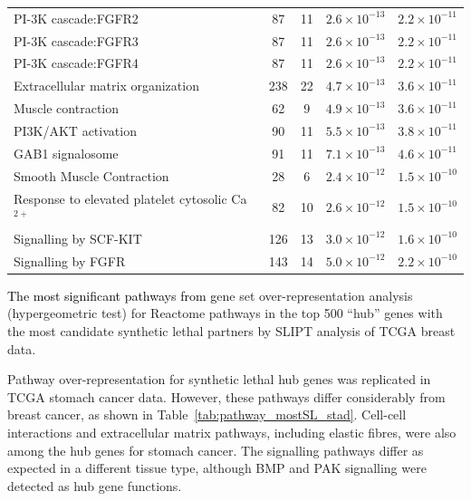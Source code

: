 \begin{table}[!ht]
{\begin{threeparttable}
\begin{tabular}{lcccc}
  \rowcolor{black!5}
  PI-3K cascade:FGFR2 &  87 &  11 & $2.6 \times 10^{-13}$ & $2.2 \times 10^{-11}$ \\ 
  \rowcolor{black!10}
  PI-3K cascade:FGFR3 &  87 &  11 & $2.6 \times 10^{-13}$ & $2.2 \times 10^{-11}$ \\ 
  \rowcolor{black!5}
  PI-3K cascade:FGFR4 &  87 &  11 & $2.6 \times 10^{-13}$ & $2.2 \times 10^{-11}$ \\ 
  \rowcolor{black!10}
  Extracellular matrix organization & 238 &  22 & $4.7 \times 10^{-13}$ & $3.6 \times 10^{-11}$ \\ 
  \rowcolor{black!5}
  Muscle contraction &  62 &   9 & $4.9 \times 10^{-13}$ & $3.6 \times 10^{-11}$ \\ 
  \rowcolor{black!10}
  PI3K/AKT activation &  90 &  11 & $5.5 \times 10^{-13}$ & $3.8 \times 10^{-11}$ \\ 
  \rowcolor{black!5}
  GAB1 signalosome &  91 &  11 & $7.1 \times 10^{-13}$ & $4.6 \times 10^{-11}$ \\ 
  \rowcolor{black!10}
  Smooth Muscle Contraction &  28 &   6 & $2.4 \times 10^{-12}$ & $1.5 \times 10^{-10}$ \\ 
  \rowcolor{black!5}
  Response to elevated platelet cytosolic Ca$^{2+}$ &  82 &  10 & $2.6 \times 10^{-12}$ & $1.5 \times 10^{-10}$ \\ 
  \rowcolor{black!10}
  Signalling by SCF-KIT & 126 &  13 & $3.0 \times 10^{-12}$ & $1.6 \times 10^{-10}$ \\ 
  \rowcolor{black!5}
  Signalling by FGFR & 143 &  14 & $5.0 \times 10^{-12}$ & $2.2 \times 10^{-10}$ \\ 
   \hline
\end{tabular}
\begin{tablenotes}
\raggedright %
\textcolor{black}{The most significant pathways from g}ene set over-representation analysis (hypergeometric test) for Reactome \glspl{pathway} in the top 500 ``hub'' genes with the most candidate \gls{synthetic lethal} partners by \gls{SLIPT} analysis of \gls{TCGA} breast  data.
\end{tablenotes}
\end{threeparttable}
}
\end{table}

Pathway over-representation for \gls{synthetic lethal} hub genes was replicated in \gls{TCGA} stomach cancer  data. However, these \glspl{pathway} differ considerably from breast cancer, as shown in Table~\ref{tab:pathway_mostSL_stad}. Cell-cell interactions and extracellular matrix \glspl{pathway}, including elastic fibres, were also among the hub genes for stomach cancer. The signalling \glspl{pathway} differ as expected in a different tissue type, although BMP and PAK signalling were detected as hub gene functions.
\fi

